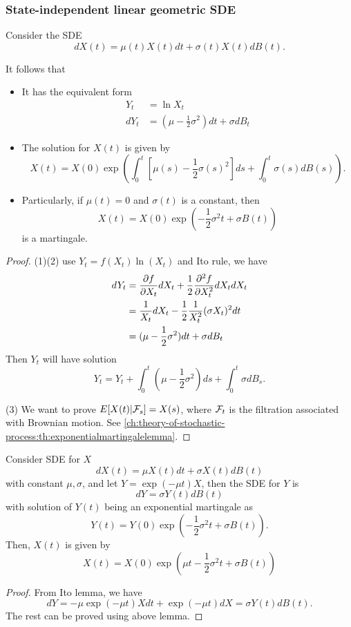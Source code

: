 \begin{refsection}
\subsubsection{State-independent linear geometric SDE}

\begin{lemma}\label{ch:theory-of-stochastic-process:th:geometricSDEsolution}
	\cite[116]{wiersema2008brownian} Consider the SDE
	$$dX(t) = \mu(t)X(t)dt + \sigma(t)X(t)dB(t).$$
	
	It follows that
	\begin{itemize}
		\item It has the equivalent form
		\begin{align*}
		Y_t &= \ln X_t \\
		dY_t & = (\mu - \frac{1}{2}\sigma^2)dt + \sigma dB_t 
		\end{align*}
		\item The solution for $X(t)$ is given by
		$$X(t)=X(0)\exp(\int_0^t[\mu(s)-\frac{1}{2}\sigma(s)^2]ds + \int_0^t \sigma(s)dB(s)).$$
		\item Particularly, if $\mu(t) = 0$ and $\sigma(t)$ is a constant, then
		$$X(t) = X(0)\exp(-\frac{1}{2}\sigma^2t + \sigma B(t))$$
		is a martingale.
	\end{itemize}
\end{lemma}
\begin{proof}
	(1)(2) use $Y_t = f(X_t)\ln(X_t)$ and Ito rule, we have 
	\begin{align*}
	dY_t &= \frac{\partial f}{\partial X_t} dX_t + \frac{1}{2}\frac{\partial^2 f}{\partial X_t^2} dX_tdX_t \\
	&= \frac{1}{X_t}dX_t - \frac{1}{2} \frac{1}{X_t^2} (\sigma X_t)^2 dt \\
	&= (\mu - \frac{1}{2}\sigma^2)dt + \sigma dB_t 
	\end{align*}
	Then $Y_t$ will have solution
	$$Y_t = Y_t + \int_0^t (\mu - \frac{1}{2}\sigma^2)ds + \int_0^t \sigma dB_s.$$
	
	(3) We want to prove $E[X(t)|\mathcal{F}_s] = X(s)$, where $\mathcal{F}_t$ is the filtration associated with Brownian motion. See \autoref{ch:theory-of-stochastic-process:th:exponentialmartingalelemma}.
\end{proof}

\begin{corollary}\label{ch:theory-of-stochastic-process:SolutionToStateIndpendentGeometricSDE}
	Consider SDE for $X$
	$$dX(t) = \mu X(t)dt + \sigma X(t)dB(t)$$
	with constant $\mu,\sigma$, and let $Y=\exp(-\mu t)X$, then the SDE for $Y$ is
	$$dY = \sigma Y(t) dB(t)$$
	with solution of $Y(t)$ being an exponential martingale as
	$$Y(t) = Y(0)\exp(-\frac{1}{2}\sigma^2t + \sigma B(t)).$$
	Then, $X(t)$ is given by 
	$$X(t) = X(0)\exp(\mu t -\frac{1}{2}\sigma^2t + \sigma B(t))$$
\end{corollary}
\begin{proof}
	From Ito lemma, we have
	$$dY = -\mu \exp(-\mu t) X dt + \exp(-\mu t) dX = \sigma Y(t) dB(t).$$
	The rest can be proved using above lemma.
\end{proof}



\end{refsection}
